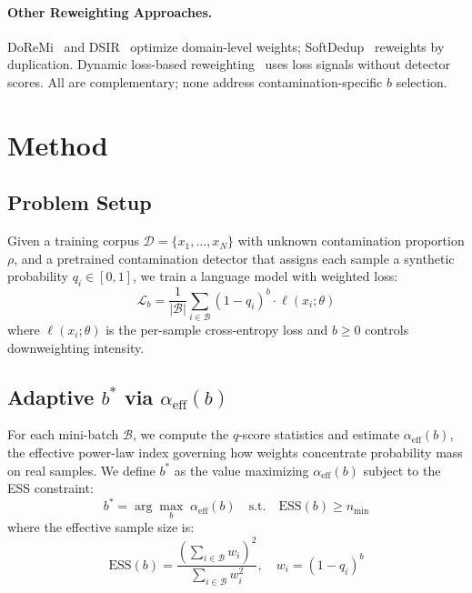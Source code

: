 \documentclass[11pt,a4paper]{article}
\newcommand{\bstar}{b^{*}}
\newcommand{\aeff}{\alpha_{\mathrm{eff}}}
\newcommand{\nmin}{n_{\min}}
\begin{document}
\paragraph{Other Reweighting Approaches.}
DoReMi~\cite{doremi2023} and DSIR~\cite{dsir2023} optimize domain-level weights; SoftDedup~\cite{softdedup2024} reweights by duplication.
Dynamic loss-based reweighting~\cite{dynamicloss2025} uses loss signals without detector scores.
All are complementary; none address contamination-specific $b$ selection.

\section{Method}
\label{sec:method}

\subsection{Problem Setup}

Given a training corpus $\mathcal{D} = \{x_1, \ldots, x_N\}$ with unknown contamination proportion $\rho$, and a pretrained contamination detector that assigns each sample a synthetic probability $q_i \in [0,1]$, we train a language model with weighted loss:
\begin{equation}
    \mathcal{L}_b = \frac{1}{|\mathcal{B}|} \sum_{i \in \mathcal{B}} (1 - q_i)^b \cdot \ell(x_i; \theta)
    \label{eq:weighted_loss}
\end{equation}
where $\ell(x_i; \theta)$ is the per-sample cross-entropy loss and $b \geq 0$ controls downweighting intensity.

\subsection{Adaptive $\bstar$ via $\aeff(b)$}

For each mini-batch $\mathcal{B}$, we compute the $q$-score statistics and estimate $\aeff(b)$, the effective power-law index governing how weights concentrate probability mass on real samples.
We define $\bstar$ as the value maximizing $\aeff(b)$ subject to the ESS constraint:
\begin{equation}
    \bstar = \arg\max_b \; \aeff(b) \quad \text{s.t.} \quad \mathrm{ESS}(b) \geq \nmin
    \label{eq:bstar}
\end{equation}
where the effective sample size is:
\begin{equation}
    \mathrm{ESS}(b) = \frac{\left(\sum_{i \in \mathcal{B}} w_i\right)^2}{\sum_{i \in \mathcal{B}} w_i^2}, \quad w_i = (1 - q_i)^b
    \label{eq:ess}
\end{equation}
\end{document}
